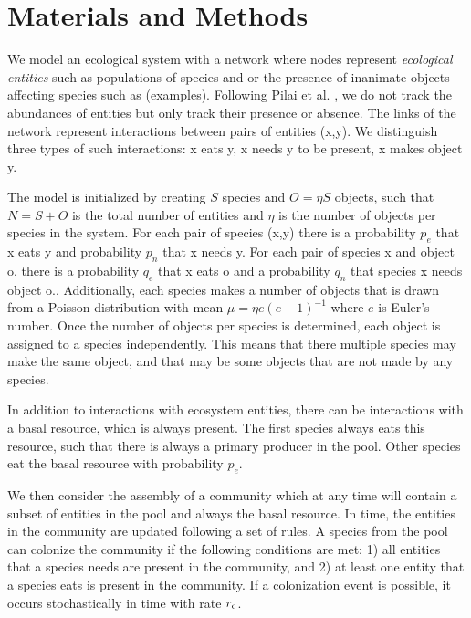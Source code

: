 \documentclass[9pt,twocolumn,twoside]{pnas-new}
\newcommand{\rr}[1]{{\rm #1}}
\begin{document}
\section*{Materials and Methods}
  \footnotesize{
  We model an ecological system with a network where nodes represent \emph{ecological entities} such as populations of species and or the presence of inanimate objects affecting species such as (examples).
  Following Pilai et al. \cite{Pillai2011}, we do not track the abundances of entities but only track their presence or absence.
  The links of the network represent interactions between pairs of entities (x,y).
  We distinguish three types of such interactions: x eats y, x needs y to be present, x makes object y.


  The model is initialized by creating $S$ species and $O = \eta S$ objects, such that $N=S+O$ is the total number of entities and $\eta$ is the number of objects per species in the system.
  For each pair of species (x,y) there is a probability $p_e$ that x eats y and probability $p_n$ that x needs y.
  For each pair of species x and object o, there is a probability $q_e$ that x eats o and a probability $q_n$ that species x needs object o..
  Additionally, each species makes a number of objects that is drawn from a Poisson distribution with mean $\mu = \eta e(e-1)^{-1}$ where $e$ is Euler's number.
  Once the number of objects per species is determined, each object is assigned to a species independently.
  This means that there multiple species may make the same object, and that may be some objects that are not made by any species.

  In addition to interactions with ecosystem entities, there can be interactions with a basal resource, which is always present.
  The first species always eats this resource, such that there is always a primary producer in the pool.
  Other species eat the basal resource with probability $p_e$.

  We then consider the assembly of a community which at any time will contain a subset of entities in the pool and always the basal resource.
  In time, the entities in the community are updated following a set of rules.
  A species from the pool can colonize the community if the following conditions are met:
  1) all entities that a species needs are present in the community, and
  2) at least one entity that a species eats is present in the community.
  If a colonization event is possible, it occurs stochastically in time with rate $r_\rr{c}$.

}
\end{document}
